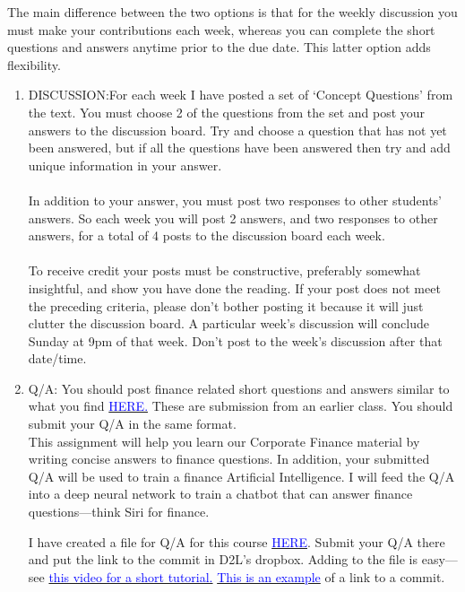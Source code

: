 \documentclass{article}
\begin{document}
  The main difference between the two options is that for the weekly discussion you must make your contributions each week, whereas you can complete the short questions and answers anytime prior to the due date.  This latter option adds flexibility.

  \begin{enumerate}
  \item DISCUSSION:\@ For each week I have posted a set of `Concept Questions' from the text.  You must choose 2 of the questions from the set and post your answers to the discussion board.  Try and choose a question that has not yet been answered, but if all the questions have been answered then try and add unique information in your answer.\\
\\
In addition to your answer, you must post two responses to other students' answers.  So each week you will post 2 answers, and two responses to other answers, for a total of 4 posts to the discussion board each week.  \\
\\
To receive credit your posts must be constructive, preferably somewhat insightful, and show you have done the reading.  If your post does not meet the preceding criteria, please don't bother posting it because it will just clutter the discussion board.  A particular week's discussion will conclude Sunday at 9pm of that week.  Don't post to the week's discussion after that date/time.

\item Q/A: You should post finance related short questions and answers similar to what you find \href{https://github.com/finance-AI/data/blob/master/studentQA/studentQA_fall_2016.txt}{\textcolor{blue}{HERE.}}  These are submission from an earlier class.  You should submit your Q/A in the same format. \\

  This assignment will help you learn our Corporate Finance material by writing concise answers to finance questions.  In addition, your submitted Q/A will be used to train a finance Artificial Intelligence.  I will feed the Q/A into a deep neural network to train a chatbot that can answer finance questions---think Siri for finance.   

  I have created a file for Q/A for this course \href{https://github.com/finance-AI/data/blob/master/studentQA/studentQA_570_spring_2017.txt}{\textcolor{blue}{HERE}}.  Submit your Q/A there and put the link to the commit in D2L's dropbox.  Adding to the file is easy---see \href{https://www.youtube.com/watch?v=iVC9UKkaiko}{\textcolor{blue}{this video for a short tutorial.}}  \href{https://github.com/FinancialMarkets/5MinuteFinance/commit/8f12f63b546a80fdb04e787514d967f1a1c0725f}{\textcolor{blue}{This is an example}} of a link to a commit.
  \end{enumerate}
\end{document}
